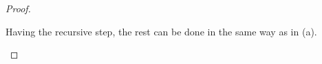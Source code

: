 \documentclass[\MainFolder/Text.tex]{subfiles}
\begin{document}
\begin{proof}
\begin{ProofList}
Having the recursive step, the rest can be done in the same way as in (a). \qedhere
%
%
\end{ProofList}
\end{proof}
\end{document}

